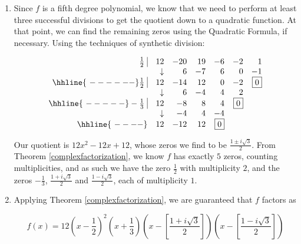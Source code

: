 \begin{exampleSol}

\begin{enumerate}

\item  Since $f$ is a fifth degree polynomial, we know that we need to perform at least three successful divisions to get the quotient down to a quadratic function.  At that point, we can find the remaining zeros using the Quadratic Formula, if necessary.  Using the techniques of synthetic division: %

\[\begin{array}{rrrrrrr}
\frac{1}{2} \, \, \vline& 12 & -20& 19  & -6 & -2 &1 \\

  & \downarrow     &  6  &  -7  & 6 & 0 & -1\\ \hhline{~------} 

 \frac{1}{2} \, \, \vline& 12 & -14 & 12  & 0 & -2 & \fbox{$0$} \\

  & \downarrow     &  6 &  -4  & 4 & 2 &\\ \hhline{~-----} 
  
  -\frac{1}{3} \, \, \vline&  12 &  -8  & 8 & 4 &  \fbox{$0$} & \\
    
               & \downarrow &  -4  &  4  & -4  & & \\ \hhline{~----} 
 
   & 12  &   -12 & 12& \fbox{0} &&   \\
  


\end{array}\]

Our quotient is $12x^2 - 12x + 12$, whose zeros we find to be $\frac{1 \pm i \sqrt{3}}{2}$.  From Theorem \ref{complexfactorization}, we know $f$ has exactly $5$ zeros, counting multiplicities, and as such we have the zero $\frac{1}{2}$ with multiplicity $2$, and the zeros $-\frac{1}{3}$, $\frac{1 + i \sqrt{3}}{2}$ and $\frac{1 - i \sqrt{3}}{2}$, each of multiplicity $1$.

\item  Applying Theorem \ref{complexfactorization}, we are guaranteed that $f$ factors as

\[f(x) = 12 \left(x- \dfrac{1}{2}\right)^2 \left(x + \dfrac{1}{3}\right) \left(x - \left[\dfrac{1 + i \sqrt{3}}{2}\right]\right) \left(x - \left[\dfrac{1 - i \sqrt{3}}{2}\right]\right)\]

\vspace{-.4in}   

\end{enumerate}

\end{exampleSol}

